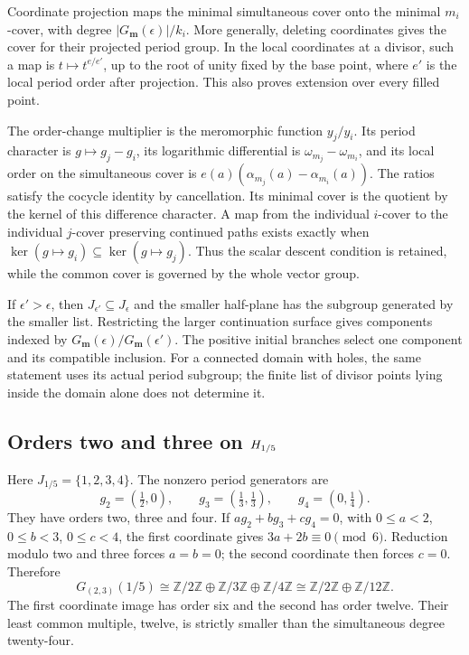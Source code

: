 Coordinate projection maps the minimal simultaneous cover onto the
minimal \(m_i\)-cover, with degree \(|G_{\mathbf m}(\epsilon)|/k_i\).
More generally, deleting coordinates gives the cover for their projected
period group.  In the local coordinates at a divisor, such a map is
\(t\mapsto t^{e/e'}\), up to the root of unity fixed by the base
point, where \(e'\) is the local period order after projection.
This also proves extension over every filled point.

The order-change multiplier is the meromorphic function \(y_j/y_i\).
Its period character is \(g\mapsto g_j-g_i\), its logarithmic differential is
\(\omega_{m_j}-\omega_{m_i}\), and its local order on the simultaneous
cover is \(e(a)(\alpha_{m_j}(a)-\alpha_{m_i}(a))\).
The ratios satisfy the cocycle identity by cancellation.
Its minimal cover is the quotient by the kernel of this difference
character.  A map from the individual \(i\)-cover to the individual
\(j\)-cover preserving continued paths exists exactly when
\(\ker(g\mapsto g_i)\subseteq\ker(g\mapsto g_j)\).
Thus the scalar descent condition is retained, while the common cover
is governed by the whole vector group.

If \(\epsilon'>\epsilon\), then \(J_{\epsilon'}\subseteq J_\epsilon\)
and the smaller half-plane has the subgroup generated by the smaller
list.  Restricting the larger continuation surface gives components
indexed by \(G_{\mathbf m}(\epsilon)/G_{\mathbf m}(\epsilon')\).
The positive initial branches select one component and its compatible
inclusion.  For a connected domain with holes, the same statement uses
its actual period subgroup; the finite list of divisor points lying
inside the domain alone does not determine it.

\subsection{Orders two and three on \texorpdfstring{\(H_{1/5}\)}{Re(s) > 1/5}}
\label{subsec:simultaneous-two-three}

Here \(J_{1/5}=\{1,2,3,4\}\).  The nonzero period generators are
\[
 g_2=(\tfrac12,0),\qquad
 g_3=(\tfrac13,\tfrac13),\qquad
 g_4=(0,\tfrac14).
\]
They have orders two, three and four.  If
\(a g_2+b g_3+c g_4=0\), with \(0\leq a<2\), \(0\leq b<3\),
\(0\leq c<4\), the first coordinate gives
\(3a+2b\equiv0\pmod6\).  Reduction modulo two and three forces
\(a=b=0\); the second coordinate then forces \(c=0\).
Therefore
\[
 G_{(2,3)}(1/5)
 \cong\mathbb Z/2\mathbb Z\oplus\mathbb Z/3\mathbb Z
                    \oplus\mathbb Z/4\mathbb Z
 \cong\mathbb Z/2\mathbb Z\oplus\mathbb Z/12\mathbb Z.
\]
The first coordinate image has order six and the second has order
twelve.  Their least common multiple, twelve, is strictly smaller than
the simultaneous degree twenty-four.

